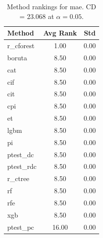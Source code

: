 \begin{table}[h]
\centering
\caption{Method rankings for mae. CD = 23.068 at $\alpha=0.05$.}
\label{tab:ranks_mae}
\begin{tabular}{lcc}
\toprule
Method & Avg Rank & Std \\
\midrule
r_cforest & 1.00 & 0.00 \\
boruta & 8.50 & 0.00 \\
cat & 8.50 & 0.00 \\
cif & 8.50 & 0.00 \\
cit & 8.50 & 0.00 \\
cpi & 8.50 & 0.00 \\
et & 8.50 & 0.00 \\
lgbm & 8.50 & 0.00 \\
pi & 8.50 & 0.00 \\
ptest_dc & 8.50 & 0.00 \\
ptest_rdc & 8.50 & 0.00 \\
r_ctree & 8.50 & 0.00 \\
rf & 8.50 & 0.00 \\
rfe & 8.50 & 0.00 \\
xgb & 8.50 & 0.00 \\
ptest_pc & 16.00 & 0.00 \\
\bottomrule
\end{tabular}
\end{table}